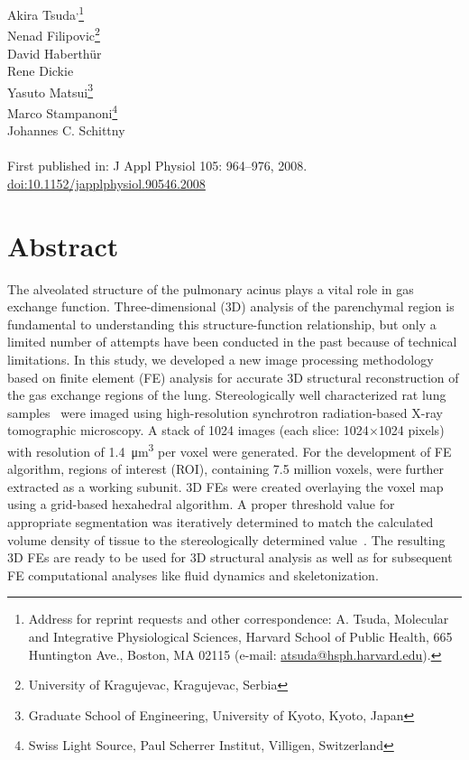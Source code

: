 \label{ch:Tsuda2008}

Akira Tsuda\textsuperscript{,}\footnote{Address for reprint requests and other correspondence: A. Tsuda, Molecular and Integrative Physiological Sciences, Harvard School of Public Health, 665 Huntington Ave., Boston, MA 02115 (e-mail: \href{mailto:atsuda@hsph.harvard.edu}{atsuda@hsph.harvard.edu}).}\\%
Nenad Filipovic\footnote{University of Kragujevac, Kragujevac, Serbia}\\%
David Haberthür\\%
Rene Dickie\\%
Yasuto Matsui\footnote{Graduate School of Engineering, University of Kyoto, Kyoto, Japan}\\%
Marco Stampanoni\footnote{Swiss Light Source, Paul Scherrer Institut, Villigen, Switzerland}\\%
Johannes C. Schittny\\\\
First published in: J Appl Physiol 105: 964–976, 2008.\\
\href{http://dx.doi.org/doi:10.1152/japplphysiol.90546.2008}{doi:10.1152/japplphysiol.90546.2008}
 
\section{Abstract}
The alveolated structure of the pulmonary acinus plays a vital role in gas exchange function. Three-dimensional (3D) analysis of the parenchymal region is fundamental to understanding this structure-function relationship, but only a limited number of attempts have been conducted in the past because of technical limitations. In this study, we developed a new image processing methodology based on finite element (FE) analysis for accurate 3D structural reconstruction of the gas exchange regions of the lung. Stereologically well characterized rat lung samples~\cite{Tschanz2003} were imaged using high-resolution synchrotron radiation-based X-ray tomographic microscopy. A stack of 1024 images (each slice: 1024$\times$1024 pixels) with resolution of \SI{1.4}{\micro\meter\cubed} per voxel were generated. For the development of FE algorithm, regions of interest (ROI), containing 7.5 million voxels, were further extracted as a working subunit. 3D FEs were created overlaying the voxel map using a grid-based hexahedral algorithm. A proper threshold value for appropriate segmentation was iteratively determined to match the calculated volume density of tissue to the stereologically determined value~\cite{Tschanz2003}. The resulting 3D FEs are ready to be used for 3D structural analysis as well as for subsequent FE computational analyses like fluid dynamics and skeletonization.

